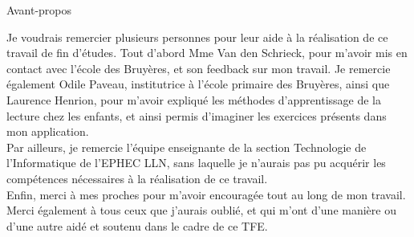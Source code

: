\begin{center}
\begin{minipage}{0.8\textwidth}
\begin{center}
\large Avant-propos
\end{center}
Je voudrais remercier plusieurs personnes pour leur aide à la réalisation de ce travail de fin d'études. Tout d'abord Mme Van den Schrieck, pour m'avoir mis en contact avec l'école des Bruyères, et son feedback sur mon travail. Je remercie également Odile Paveau, institutrice à l'école primaire des Bruyères, ainsi que Laurence Henrion, pour m'avoir expliqué les méthodes d'apprentissage de la lecture chez les enfants, et ainsi permis d'imaginer les exercices présents dans mon application.\\

Par ailleurs, je remercie l'équipe enseignante de la section Technologie de l'Informatique de l'EPHEC LLN, sans laquelle je n'aurais pas pu acquérir les compétences nécessaires à la réalisation de ce travail.\\

Enfin, merci à mes proches pour m'avoir encouragée tout au long de mon travail. Merci également à tous ceux que j'aurais oublié, et qui m'ont d'une manière ou d'une autre aidé et soutenu dans le cadre de ce TFE.
\end{minipage}
\end{center}
